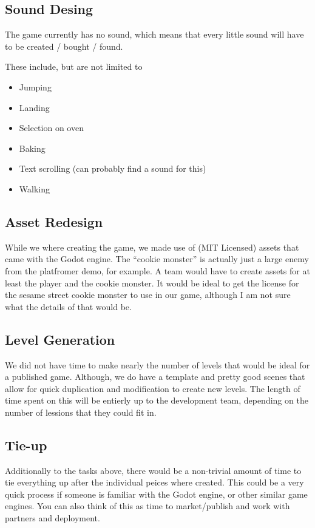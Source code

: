 \documentclass{article}
\begin{document}
\subsection{Sound Desing}

The game currently has no sound, which means that every little sound
will have to be created / bought / found.

These include, but are not limited to

\begin{itemize}
  \item Jumping
  \item Landing
  \item Selection on oven
  \item Baking
  \item Text scrolling (can probably find a sound for this)
  \item Walking
\end{itemize}

\subsection{Asset Redesign}

While we where creating the game, we made use of (MIT Licensed) assets
that came with the Godot engine. The ``cookie monster'' is actually
just a large enemy from the platfromer demo, for example. A team would
have to create assets for at least the player and the cookie
monster. It would be ideal to get the license for the sesame street
cookie monster to use in our game, although I am not sure what the
details of that would be.

\subsection{Level Generation}

We did not have time to make nearly the number of levels that would be
ideal for a published game. Although, we do have a template and pretty
good scenes that allow for quick duplication and modification to
create new levels. The length of time spent on this will be entierly
up to the development team, depending on the number of lessions that
they could fit in.

\subsection{Tie-up}

Additionally to the tasks above, there would be a non-trivial amount
of time to tie everything up after the individual peices where
created. This could be a very quick process if someone is familiar
with the Godot engine, or other similar game engines. You can also
think of this as time to market/publish and work with partners and deployment.
\end{document}
